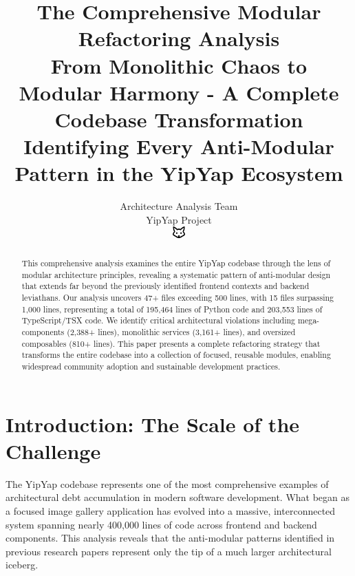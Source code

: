 \documentclass[11pt]{article}
\begin{document}
\title{\textbf{The Comprehensive Modular Refactoring Analysis} \\
\Large{From Monolithic Chaos to Modular Harmony - A Complete Codebase Transformation} \\
\large{Identifying Every Anti-Modular Pattern in the YipYap Ecosystem}}

\author{Architecture Analysis Team\\
YipYap Project\\
\includegraphics[width=0.5cm]{favicon.pdf}}

\maketitle

\begin{abstract}
This comprehensive analysis examines the entire YipYap codebase through the lens of modular architecture principles, revealing a systematic pattern of anti-modular design that extends far beyond the previously identified frontend contexts and backend leviathans. Our analysis uncovers 47+ files exceeding 500 lines, with 15 files surpassing 1,000 lines, representing a total of 195,464 lines of Python code and 203,553 lines of TypeScript/TSX code. We identify critical architectural violations including mega-components (2,388+ lines), monolithic services (3,161+ lines), and oversized composables (810+ lines). This paper presents a complete refactoring strategy that transforms the entire codebase into a collection of focused, reusable modules, enabling widespread community adoption and sustainable development practices.
\end{abstract}

\tableofcontents
\newpage

\section{Introduction: The Scale of the Challenge}

The YipYap codebase represents one of the most comprehensive examples of architectural debt accumulation in modern software development. What began as a focused image gallery application has evolved into a massive, interconnected system spanning nearly 400,000 lines of code across frontend and backend components. This analysis reveals that the anti-modular patterns identified in previous research papers represent only the tip of a much larger architectural iceberg.
\end{document}
